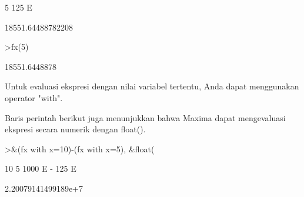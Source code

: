 \documentclass{article}
\begin{document}
\begin{eulernotebook}
\begin{eulercomment}
\begin{eulercomment}
\begin{eulercomment}
\begin{eulercomment}
\begin{euleroutput}
                                       5
                                  125 E
  
  
                            18551.64488782208
  
\end{euleroutput}
\begin{eulerprompt}
>fx(5)
\end{eulerprompt}
\begin{euleroutput}
  18551.6448878
\end{euleroutput}
\begin{eulercomment}
Untuk evaluasi ekspresi dengan nilai variabel tertentu, Anda dapat
menggunakan operator "with".

Baris perintah berikut juga menunjukkan bahwa Maxima dapat
mengevaluasi ekspresi secara numerik dengan float().
\end{eulercomment}
\begin{eulerprompt}
>&(fx with x=10)-(fx with x=5), &float(%
\end{eulerprompt}
\begin{euleroutput}
  
                                  10        5
                            1000 E   - 125 E
  
  
                           2.20079141499189e+7
  

\end{euleroutput}
\end{eulercomment}
\end{eulercomment}
\end{eulercomment}
\end{eulercomment}
\end{eulernotebook}
\end{document}
